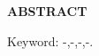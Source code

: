 {}

\begin{center}
	\textbf{ABSTRACT}
\end{center}
\vspace{\baselineskip}

\lipsum[26-27]

\vspace{1\baselineskip}
\noindent Keyword: -,-,-,-.
